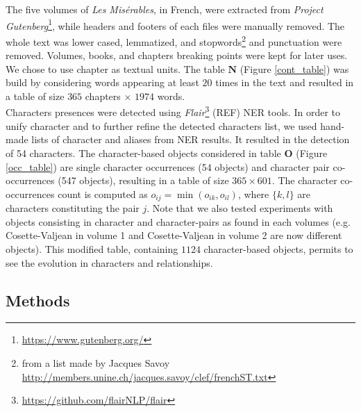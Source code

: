 \documentclass[
twocolumn,
]{ceurart}
\begin{document}
The five volumes of \emph{Les Misérables}, in French, were extracted from \emph{Project Gutenberg}\footnote{\url{https://www.gutenberg.org/}}, while headers and footers of each files were manually removed. The whole text was lower cased, lemmatized, and stopwords\footnote{from a list made by Jacques Savoy \url{http://members.unine.ch/jacques.savoy/clef/frenchST.txt}} and punctuation were removed. Volumes, books, and chapters breaking points were kept for later uses. \\
We chose to use chapter as textual units. The table $\mathbf{N}$ (Figure \ref{cont_table}) was build by considering words appearing at least $20$ times in the text and resulted in a table of size $365$ chapters $\times$ $1974$ words. \\
Characters presences were detected using \emph{Flair}\footnote{\url{https://github.com/flairNLP/flair}} (REF) NER tools. In order to unify character and to further refine the detected characters list, we used hand-made lists of character and aliases from NER results. It resulted in the detection of 54 characters. The character-based objects considered in table $\mathbf{O}$ (Figure \ref{occ_table}) are single character occurrences (54 objects) and character pair co-occurrences (547 objects), resulting in a table of size $365 \times 601$. The character co-occurrences count is computed as $o_{ij} = \min(o_{ik}, o_{il})$, where $\{k, l\}$ are characters constituting the pair $j$. Note that we also tested experiments with objects consisting in character and character-pairs as found in each volumes (e.g. Cosette-Valjean in volume 1 and Cosette-Valjean in volume 2 are now different objects). This modified table, containing $1124$ character-based objects, permits to see the evolution in characters and relationships. 

\subsection{Methods}
\end{document}
